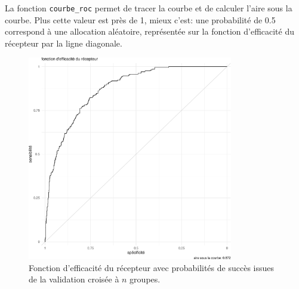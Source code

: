 \documentclass[
  11pt,
  letterpaper,
]{book}
\newenvironment{Shaded}{\begin{snugshade}}{\end{snugshade}}
\newcommand{\AttributeTok}[1]{\textcolor[rgb]{0.40,0.45,0.13}{#1}}
\newcommand{\CommentTok}[1]{\textcolor[rgb]{0.37,0.37,0.37}{#1}}
\newcommand{\ConstantTok}[1]{\textcolor[rgb]{0.56,0.35,0.01}{#1}}
\newcommand{\DocumentationTok}[1]{\textcolor[rgb]{0.37,0.37,0.37}{\textit{#1}}}
\newcommand{\FunctionTok}[1]{\textcolor[rgb]{0.28,0.35,0.67}{#1}}
\newcommand{\NormalTok}[1]{\textcolor[rgb]{0.00,0.23,0.31}{#1}}
\newcommand{\OtherTok}[1]{\textcolor[rgb]{0.00,0.23,0.31}{#1}}
\newcommand{\SpecialCharTok}[1]{\textcolor[rgb]{0.37,0.37,0.37}{#1}}
\theoremstyle{definition}
\theoremstyle{remark}
\begin{document}
La fonction \texttt{courbe\_roc} permet de tracer la courbe et de
calculer l'aire sous la courbe. Plus cette valeur est près de 1, mieux
c'est: une probabilité de 0.5 correspond à une allocation aléatoire,
représentée sur la fonction d'efficacité du récepteur par la ligne
diagonale.

\begin{figure}[ht!]

{\centering \includegraphics[width=0.8\textwidth,height=\textheight]{./05-reglogistique_files/figure-pdf/fig-roccurve-1.pdf}

}

\caption{\label{fig-roccurve}Fonction d'efficacité du récepteur avec
probabilités de succès issues de la validation croisée à \(n\) groupes.}

\end{figure}

\begin{Shaded}
\end{Shaded}
\end{document}
